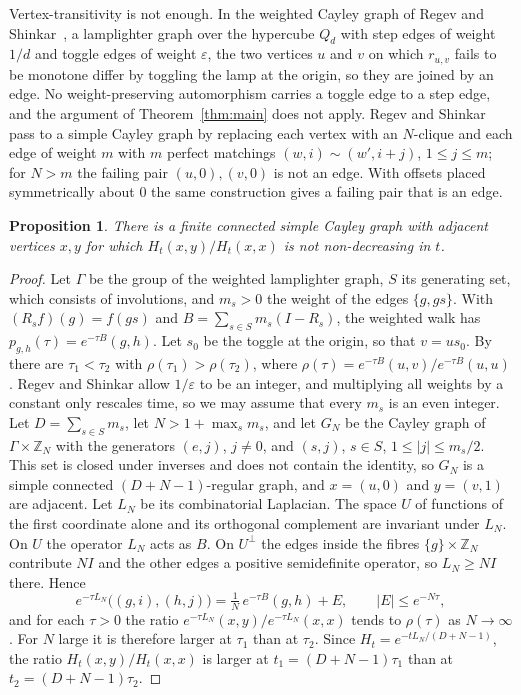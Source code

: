 \documentclass[11pt]{amsart}
\newtheorem{proposition}[theorem]{Proposition}
\theoremstyle{definition}
\theoremstyle{remark}
\begin{document}
Vertex-transitivity is not enough. In the weighted Cayley graph of Regev and Shinkar~\cite[Section~3]{RS}, a lamplighter graph over the hypercube $Q_d$ with step edges of weight $1/d$ and toggle edges of weight $\varepsilon$, the two vertices $u$ and $v$ on which $r_{u,v}$ fails to be monotone differ by toggling the lamp at the origin, so they are joined by an edge. No weight-preserving automorphism carries a toggle edge to a step edge, and the argument of Theorem~\ref{thm:main} does not apply. Regev and Shinkar pass to a simple Cayley graph by replacing each vertex with an $N$-clique and each edge of weight $m$ with $m$ perfect matchings $(w,i)\sim(w',i+j)$, $1\le j\le m$; for $N>m$ the failing pair $(u,0),(v,0)$ is not an edge. With offsets placed symmetrically about $0$ the same construction gives a failing pair that is an edge.

\begin{proposition}\label{prop:vt}
There is a finite connected simple Cayley graph with adjacent vertices $x,y$ for which $H_t(x,y)/H_t(x,x)$ is not non-decreasing in $t$.
\end{proposition}

\begin{proof}
Let $\Gamma$ be the group of the weighted lamplighter graph, $S$ its generating set, which consists of involutions, and $m_s>0$ the weight of the edges $\{g,gs\}$. With $(R_sf)(g)=f(gs)$ and $B=\sum_{s\in S}m_s(I-R_s)$, the weighted walk has $p_{g,h}(\tau)=e^{-\tau B}(g,h)$. Let $s_0$ be the toggle at the origin, so that $v=us_0$. By~\cite[Section~3]{RS} there are $\tau_1<\tau_2$ with $\rho(\tau_1)>\rho(\tau_2)$, where $\rho(\tau)=e^{-\tau B}(u,v)/e^{-\tau B}(u,u)$. Regev and Shinkar allow $1/\varepsilon$ to be an integer, and multiplying all weights by a constant only rescales time, so we may assume that every $m_s$ is an even integer. Let $D=\sum_{s\in S}m_s$, let $N>1+\max_s m_s$, and let $G_N$ be the Cayley graph of $\Gamma\times\mathbb Z_N$ with the generators $(e,j)$, $j\ne0$, and $(s,j)$, $s\in S$, $1\le|j|\le m_s/2$. This set is closed under inverses and does not contain the identity, so $G_N$ is a simple connected $(D+N-1)$-regular graph, and $x=(u,0)$ and $y=(v,1)$ are adjacent. Let $L_N$ be its combinatorial Laplacian. The space $U$ of functions of the first coordinate alone and its orthogonal complement are invariant under $L_N$. On $U$ the operator $L_N$ acts as $B$. On $U^\perp$ the edges inside the fibres $\{g\}\times\mathbb Z_N$ contribute $NI$ and the other edges a positive semidefinite operator, so $L_N\ge NI$ there. Hence
\[
e^{-\tau L_N}\big((g,i),(h,j)\big)=\tfrac1N\,e^{-\tau B}(g,h)+E,\qquad |E|\le e^{-N\tau},
\]
and for each $\tau>0$ the ratio $e^{-\tau L_N}(x,y)/e^{-\tau L_N}(x,x)$ tends to $\rho(\tau)$ as $N\to\infty$. For $N$ large it is therefore larger at $\tau_1$ than at $\tau_2$. Since $H_t=e^{-tL_N/(D+N-1)}$, the ratio $H_t(x,y)/H_t(x,x)$ is larger at $t_1=(D+N-1)\tau_1$ than at $t_2=(D+N-1)\tau_2$.
\end{proof}
\end{document}
